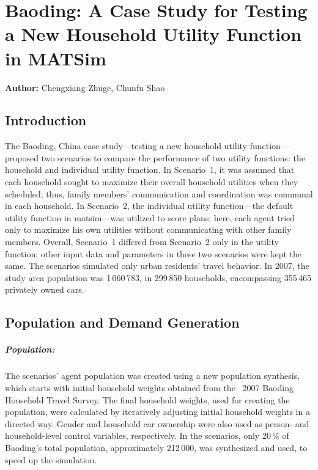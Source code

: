 \chapter{Baoding: A Case Study for Testing a New Household Utility Function in MATSim}
\label{ch:baoding}
\hfill \textbf{Author:} Chengxiang Zhuge, Chunfu Shao


\section{Introduction}
The Baoding, China case study---testing a new household utility function---proposed two scenarios to compare the performance of two utility functions: the household and individual utility function. 
In Scenario~1, it was assumed that each household sought to maximize their overall household utilities when they scheduled; thus, family members' communication and coordination was communal in each household. In Scenario~2, the individual utility function---the default utility function in \gls{matsim}---was utilized to score plans; here, each agent tried only  to maximize his own utilities without communicating with other family members. 
Overall, Scenario~1 differed from Scenario~2 only in the utility function; other input data and parameters in these two scenarios were kept the same. 
The scenarios simulated only urban residents' travel behavior. 
In 2007, the study area population was 1\,060\,783, in 299\,850 households, encompassing 355\,465 privately owned cars.  

\section{Population and Demand Generation}
\paragraph{Population:} The scenarios' agent population was created using a new population synthesis, which  starts with initial household weights obtained from the ~2007 Baoding  Household Travel Survey. 
The final household weights, used for creating the population, were calculated by iteratively adjusting initial household weights in a directed way. 
Gender and household car ownership were also used as person- and household-level control variables, respectively. 
In the scenarios, only 20\,\% of Baoding's total population, approximately 212\,000, was synthesized and used, to speed up the simulation. 

